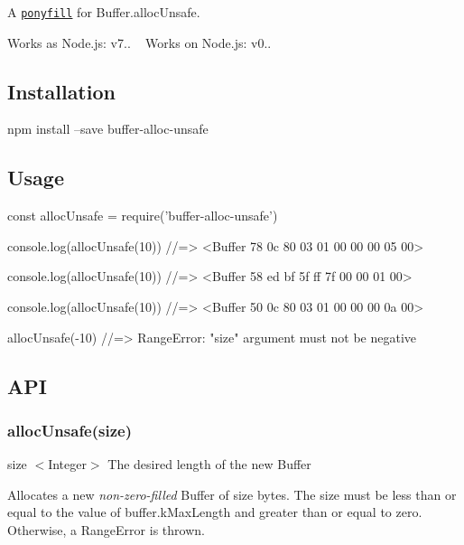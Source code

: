 A \href{https://ponyfill.com}{\tt ponyfill} for {\ttfamily Buffer.\+alloc\+Unsafe}.

Works as Node.\+js\+: {\ttfamily v7..} ~\newline
 Works on Node.\+js\+: {\ttfamily v0..}

\subsection*{Installation}


\begin{DoxyCode}
npm install --save buffer-alloc-unsafe
\end{DoxyCode}


\subsection*{Usage}


\begin{DoxyCode}
const allocUnsafe = require('buffer-alloc-unsafe')

console.log(allocUnsafe(10))
//=> <Buffer 78 0c 80 03 01 00 00 00 05 00>

console.log(allocUnsafe(10))
//=> <Buffer 58 ed bf 5f ff 7f 00 00 01 00>

console.log(allocUnsafe(10))
//=> <Buffer 50 0c 80 03 01 00 00 00 0a 00>

allocUnsafe(-10)
//=> RangeError: "size" argument must not be negative
\end{DoxyCode}


\subsection*{A\+PI}

\subsubsection*{alloc\+Unsafe(size)}


\begin{DoxyItemize}
\item {\ttfamily size} $<$Integer$>$ The desired length of the new {\ttfamily Buffer}
\end{DoxyItemize}

Allocates a new {\itshape non-\/zero-\/filled} {\ttfamily Buffer} of {\ttfamily size} bytes. The {\ttfamily size} must be less than or equal to the value of {\ttfamily buffer.\+k\+Max\+Length} and greater than or equal to zero. Otherwise, a {\ttfamily Range\+Error} is thrown.

